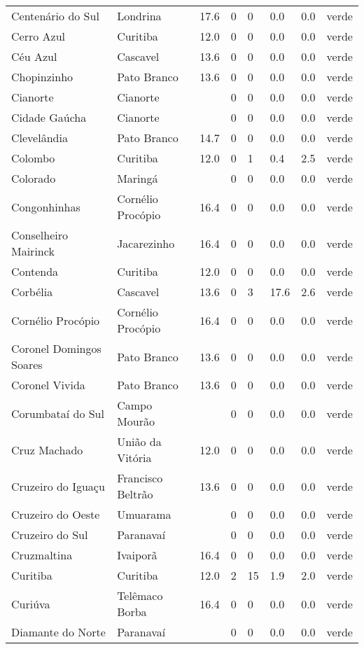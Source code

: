 \begin{longtable}{l|lllllll}
  Centenário do Sul & Londrina & 17.6 & 0 & 0 & 0.0 & 0.0 & verde \\ 
  Cerro Azul & Curitiba & 12.0 & 0 & 0 & 0.0 & 0.0 & verde \\ 
  Céu Azul & Cascavel & 13.6 & 0 & 0 & 0.0 & 0.0 & verde \\ 
  Chopinzinho & Pato Branco & 13.6 & 0 & 0 & 0.0 & 0.0 & verde \\ 
  Cianorte & Cianorte &  & 0 & 0 & 0.0 & 0.0 & verde \\ 
  Cidade Gaúcha & Cianorte &  & 0 & 0 & 0.0 & 0.0 & verde \\ 
  Clevelândia & Pato Branco & 14.7 & 0 & 0 & 0.0 & 0.0 & verde \\ 
  Colombo & Curitiba & 12.0 & 0 & 1 & 0.4 & 2.5 & verde \\ 
  Colorado & Maringá &  & 0 & 0 & 0.0 & 0.0 & verde \\ 
  Congonhinhas & Cornélio Procópio & 16.4 & 0 & 0 & 0.0 & 0.0 & verde \\ 
  Conselheiro Mairinck & Jacarezinho & 16.4 & 0 & 0 & 0.0 & 0.0 & verde \\ 
  Contenda & Curitiba & 12.0 & 0 & 0 & 0.0 & 0.0 & verde \\ 
  Corbélia & Cascavel & 13.6 & 0 & 3 & 17.6 & 2.6 & verde \\ 
  Cornélio Procópio & Cornélio Procópio & 16.4 & 0 & 0 & 0.0 & 0.0 & verde \\ 
  Coronel Domingos Soares & Pato Branco & 13.6 & 0 & 0 & 0.0 & 0.0 & verde \\ 
  Coronel Vivida & Pato Branco & 13.6 & 0 & 0 & 0.0 & 0.0 & verde \\ 
  Corumbataí do Sul & Campo Mourão &  & 0 & 0 & 0.0 & 0.0 & verde \\ 
  Cruz Machado & União da Vitória & 12.0 & 0 & 0 & 0.0 & 0.0 & verde \\ 
  Cruzeiro do Iguaçu & Francisco Beltrão & 13.6 & 0 & 0 & 0.0 & 0.0 & verde \\ 
  Cruzeiro do Oeste & Umuarama &  & 0 & 0 & 0.0 & 0.0 & verde \\ 
  Cruzeiro do Sul & Paranavaí &  & 0 & 0 & 0.0 & 0.0 & verde \\ 
  Cruzmaltina & Ivaiporã & 16.4 & 0 & 0 & 0.0 & 0.0 & verde \\ 
  Curitiba & Curitiba & 12.0 & 2 & 15 & 1.9 & 2.0 & verde \\ 
  Curiúva & Telêmaco Borba & 16.4 & 0 & 0 & 0.0 & 0.0 & verde \\ 
  Diamante do Norte & Paranavaí &  & 0 & 0 & 0.0 & 0.0 & verde \\ 

\end{longtable}

